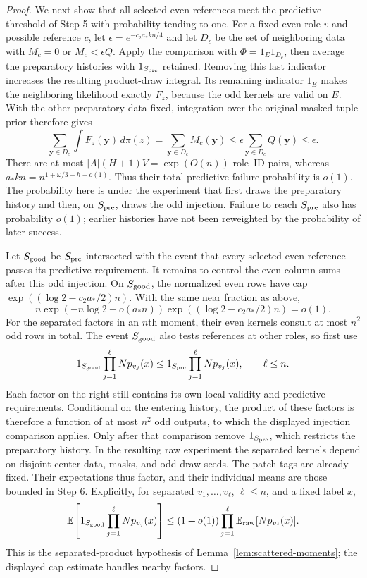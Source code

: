 \begin{proof}
We next show that all selected even references meet the predictive
threshold of Step 5 with probability tending to one. For a fixed even
role \(v\) and possible reference \(c\), let
\(\epsilon=e^{-c_2a_*kn/4}\) and let \(D_c\) be the set of neighboring
data with \(M_c=0\) or \(M_c<\epsilon Q\). Apply the comparison with
\(\Phi=1_E1_{D_c}\), then average the preparatory histories with
\(1_{S_{\rm pre}}\) retained. Removing this last indicator increases
the resulting product-draw integral. Its remaining indicator \(1_E\)
makes the neighboring likelihood exactly \(F_z\), because the odd
kernels are valid on \(E\). With the other preparatory data fixed,
integration over the original masked tuple prior therefore gives
\[
 \sum_{\mathbf y\in D_c}\int F_z(\mathbf y)\,d\pi(z)
   =\sum_{\mathbf y\in D_c}M_c(\mathbf y)
   \le\epsilon\sum_{\mathbf y\in D_c}Q(\mathbf y)
   \le\epsilon.
\]
There are at most \(|A|(H+1)V=\exp(O(n))\) role--ID pairs, whereas
\(a_*kn=n^{1+\omega/3-h+o(1)}\). Thus their total predictive-failure
probability is \(o(1)\). The probability here is under the experiment
that first draws the preparatory history and then, on \(S_{\rm pre}\),
draws the odd injection. Failure to reach \(S_{\rm pre}\) also has
probability \(o(1)\); earlier histories have not been reweighted by the
probability of later success.

Let \(S_{\rm good}\) be \(S_{\rm pre}\) intersected with the event
that every selected even reference passes its predictive requirement.
It remains to control the even column sums after this odd injection.
On \(S_{\rm good}\), the normalized even rows have cap
\(\exp((\log2-c_2a_*/2)n)\). With the same near fraction as above,
\[
 n\exp(-n\log2+o(a_*n))
       \exp((\log2-c_2a_*/2)n)=o(1).
\]
For the separated factors in an \(n\)th moment, their even kernels
consult at most \(n^2\) odd rows in total. The event \(S_{\rm good}\)
also tests references at other roles, so first use
\[
 1_{S_{\rm good}}\prod_{j=1}^{\ell}Np_{v_j}(x)
       \le 1_{S_{\rm pre}}\prod_{j=1}^{\ell}Np_{v_j}(x),
       \qquad \ell\le n.
\]
Each factor on the right still contains its own local validity and
predictive requirements. Conditional on the entering history, the product
of these factors is therefore a function of at most \(n^2\) odd outputs,
to which the displayed injection comparison applies. Only after that
comparison remove \(1_{S_{\rm pre}}\), which restricts the preparatory
history. In the resulting raw experiment the separated kernels depend on
disjoint center data, masks, and odd draw seeds. The patch tags are
already fixed. Their expectations thus factor, and their individual
means are those bounded in Step 6. Explicitly, for separated
\(v_1,\ldots,v_\ell\), \(\ell\le n\), and a fixed label \(x\),
\[
 \mathbb E\!\left[1_{S_{\rm good}}
                  \prod_{j=1}^{\ell}Np_{v_j}(x)\right]
       \le(1+o(1))\prod_{j=1}^{\ell}
                    \mathbb E_{\rm raw}[Np_{v_j}(x)].
\]
This is the separated-product hypothesis of
Lemma~\ref{lem:scattered-moments}; the displayed cap estimate handles
nearby factors.


\end{proof}
